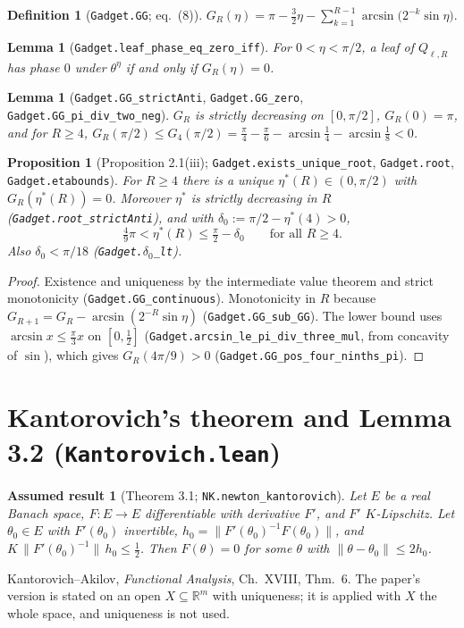 \documentclass[11pt]{amsart}
\newcommand{\leanname}[1]{\texttt{\textcolor{black!75}{#1}}}
\newcommand{\lfile}[1]{\texttt{#1}}
\newcommand{\R}{\mathbb{R}}
\newcommand{\Q}{Q_{\ell,R}}
\theoremstyle{plain}
\newtheorem{lemma}[theorem]{Lemma}
\newtheorem{proposition}[theorem]{Proposition}
\newtheorem{axiom}[theorem]{Assumed result}
\theoremstyle{definition}
\newtheorem{definition}[theorem]{Definition}
\theoremstyle{remark}
\begin{document}
\begin{definition}[\leanname{Gadget.GG}; eq.\ (8)]
$\displaystyle G_R(\eta)=\pi-\tfrac32\eta-\sum_{k=1}^{R-1}\arcsin\bigl(2^{-k}\sin\eta\bigr).$
\end{definition}

\begin{lemma}[\leanname{Gadget.leaf\_phase\_eq\_zero\_iff}]
For $0<\eta<\pi/2$, a leaf of $\Q$ has phase $0$ under $\theta^\eta$ if and only if
$G_R(\eta)=0$.
\end{lemma}

\begin{lemma}[\leanname{Gadget.GG\_strictAnti}, \leanname{Gadget.GG\_zero}, \leanname{Gadget.GG\_pi\_div\_two\_neg}]
$G_R$ is strictly decreasing on $[0,\pi/2]$, $G_R(0)=\pi$, and for $R\ge4$,
$G_R(\pi/2)\le G_4(\pi/2)=\frac\pi4-\frac\pi6-\arcsin\frac14-\arcsin\frac18<0$.
\end{lemma}

\begin{proposition}[Proposition 2.1(iii); \leanname{Gadget.exists\_unique\_root},
\leanname{Gadget.root}, \leanname{Gadget.etabounds}]\label{prop:21iii}
For $R\ge4$ there is a unique $\eta^*(R)\in(0,\pi/2)$ with $G_R(\eta^*(R))=0$. Moreover
$\eta^*$ is strictly decreasing in $R$ (\leanname{Gadget.root\_strictAnti}), and with
$\delta_0:=\pi/2-\eta^*(4)>0$,
\[
\tfrac49\pi<\eta^*(R)\le\tfrac\pi2-\delta_0\qquad\text{for all }R\ge4 .
\]
Also $\delta_0<\pi/18$ (\leanname{Gadget.}$\delta_0$\leanname{\_lt}).
\end{proposition}
\begin{proof}
Existence and uniqueness by the intermediate value theorem and strict monotonicity
(\leanname{Gadget.GG\_continuous}). Monotonicity in $R$ because $G_{R+1}=G_R-\arcsin(2^{-R}\sin\eta)$
(\leanname{Gadget.GG\_sub\_GG}). The lower bound uses $\arcsin x\le\frac\pi3x$ on $[0,\frac12]$
(\leanname{Gadget.arcsin\_le\_pi\_div\_three\_mul}, from concavity of $\sin$), which gives
$G_R(4\pi/9)>0$ (\leanname{Gadget.GG\_pos\_four\_ninths\_pi}).
\end{proof}

\section{Kantorovich's theorem and Lemma 3.2 (\lfile{Kantorovich.lean})}

\begin{axiom}[Theorem 3.1; \leanname{NK.newton\_kantorovich}]\label{ax:nk}
Let $E$ be a real Banach space, $F:E\to E$ differentiable with derivative $F'$, and $F'$
$K$-Lipschitz. Let $\theta_0\in E$ with $F'(\theta_0)$ invertible, $h_0=\|F'(\theta_0)^{-1}F(\theta_0)\|$,
and $K\,\|F'(\theta_0)^{-1}\|\,h_0\le\frac12$. Then $F(\theta)=0$ for some $\theta$ with
$\|\theta-\theta_0\|\le2h_0$.
\end{axiom}
\noindent Kantorovich--Akilov, \emph{Functional Analysis}, Ch.~XVIII, Thm.~6. The paper's version
is stated on an open $X\subseteq\R^m$ with uniqueness; it is applied with $X$ the whole space,
and uniqueness is not used.
\end{document}

